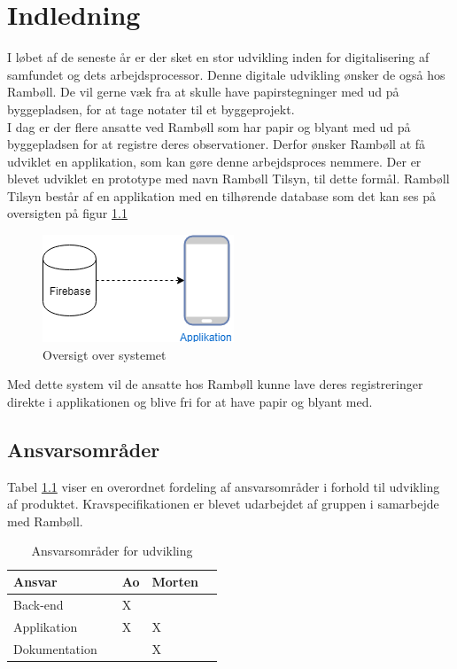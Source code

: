 \chapter{Indledning}

I løbet af de seneste år er der sket en stor udvikling inden for digitalisering af samfundet og dets arbejdsprocessor. Denne digitale udvikling ønsker de også hos Rambøll. De vil gerne væk fra at skulle have papirstegninger med ud på byggepladsen, for at tage notater til et byggeprojekt. \\
I dag er der flere ansatte ved Rambøll som har papir og blyant med ud på byggepladsen for at registre deres observationer. Derfor ønsker Rambøll at få udviklet en applikation, som kan gøre denne arbejdsproces nemmere.
Der er blevet udviklet en prototype med navn Rambøll Tilsyn, til dette formål.
Rambøll Tilsyn består af en applikation med en tilhørende database som det kan ses på oversigten på figur \ref{fig:OversigtSystembeskrivelse}


\begin{figure}[H]
	\centering
	\includegraphics[width=0.4\linewidth]{Indledning/Oversigtoversystem}
	\caption{Oversigt over systemet}
	\label{fig:OversigtSystembeskrivelse}
\end{figure}

Med dette system vil de ansatte hos Rambøll kunne lave deres registreringer direkte i applikationen og blive fri for at have papir og blyant med. \\

\section*{Ansvarsområder}
Tabel \ref{Produktansvar} viser en overordnet fordeling af ansvarsområder i forhold til udvikling af produktet. Kravspecifikationen er blevet udarbejdet af gruppen i samarbejde med Rambøll. \\

\begin{table}[H]
	\centering
	\begin{tabular}{lllll} \hline
		\textbf{Ansvar} &  & \textbf{Ao}&  \textbf{Morten}&  \\ \hline
		Back-end&  &  X&  &  \\ \hline
		Applikation&  &  X&  X&  \\ \hline
		Dokumentation& & & X& \\ \hline
	\end{tabular}
	\caption{Ansvarsområder for udvikling}
	\label{Produktansvar}
\end{table}
